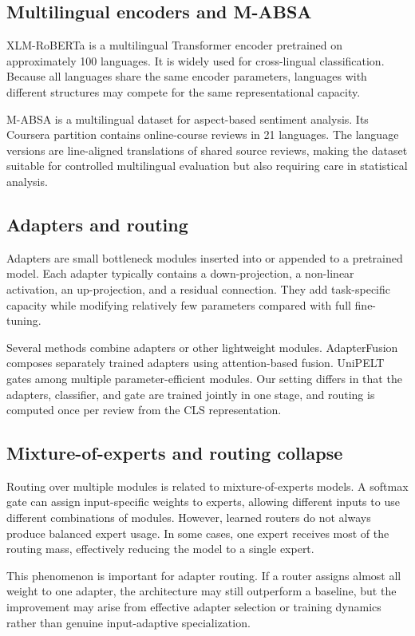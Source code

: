 \documentclass[review,12pt]{elsarticle}
\begin{document}
\subsection{Multilingual encoders and M-ABSA}
XLM-RoBERTa is a multilingual Transformer encoder pretrained on approximately 100 languages. It is widely used for cross-lingual classification. Because all languages share the same encoder parameters, languages with different structures may compete for the same representational capacity.

M-ABSA is a multilingual dataset for aspect-based sentiment analysis. Its Coursera partition contains online-course reviews in 21 languages. The language versions are line-aligned translations of shared source reviews, making the dataset suitable for controlled multilingual evaluation but also requiring care in statistical analysis.

\subsection{Adapters and routing}
Adapters are small bottleneck modules inserted into or appended to a pretrained model. Each adapter typically contains a down-projection, a non-linear activation, an up-projection, and a residual connection. They add task-specific capacity while modifying relatively few parameters compared with full fine-tuning.

Several methods combine adapters or other lightweight modules. AdapterFusion composes separately trained adapters using attention-based fusion. UniPELT gates among multiple parameter-efficient modules. Our setting differs in that the adapters, classifier, and gate are trained jointly in one stage, and routing is computed once per review from the CLS representation.

\subsection{Mixture-of-experts and routing collapse}
Routing over multiple modules is related to mixture-of-experts models. A softmax gate can assign input-specific weights to experts, allowing different inputs to use different combinations of modules. However, learned routers do not always produce balanced expert usage. In some cases, one expert receives most of the routing mass, effectively reducing the model to a single expert.

This phenomenon is important for adapter routing. If a router assigns almost all weight to one adapter, the architecture may still outperform a baseline, but the improvement may arise from effective adapter selection or training dynamics rather than genuine input-adaptive specialization.
\end{document}
